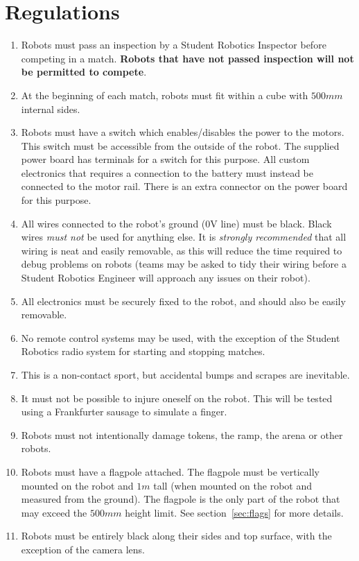 \section {Regulations}
\label{regs}

\begin{enumerate}
\item Robots must pass an inspection by a Student Robotics Inspector before competing in a match.
 \textbf{Robots that have not passed inspection will not be permitted to compete}.
\item At the beginning of each match, robots must fit within a cube with $500mm$ internal sides.
\item Robots must have a switch which enables/disables the power to the motors.
 This switch must be accessible from the outside of the robot.
 The supplied power board has terminals for a switch for this purpose.
 All custom electronics that requires a connection to the battery must instead be connected to the motor rail.
 There is an extra connector on the power board for this purpose.
\item All wires connected to the robot's ground (0V line) must be black.
 Black wires \emph{must not} be used for anything else.
 It is \emph{strongly recommended} that all wiring is neat and easily removable, as this will reduce the time required to debug problems on robots (teams may be asked to tidy their wiring before a Student Robotics Engineer will approach any issues on their robot).
\item All electronics must be securely fixed to the robot, and should also be easily removable.
\item No remote control systems may be used, with the exception of the Student Robotics radio system for starting and stopping matches.
\item This is a non-contact sport, but accidental bumps and scrapes are inevitable.
\item It must not be possible to injure oneself on the robot.
 This will be tested using a Frankfurter sausage to simulate a finger.
\item Robots must not intentionally damage tokens, the ramp, the arena or other robots.
\item Robots must have a flagpole attached.
 The flagpole must be vertically mounted on the robot and $1m$ tall (when mounted on the robot and measured from the ground).
 The flagpole is the only part of the robot that may exceed the $500mm$ height limit.
 See section~\ref{sec:flags} for more details.
\item Robots must be entirely black along their sides and top surface, with the exception of the camera lens.

\end{enumerate}
